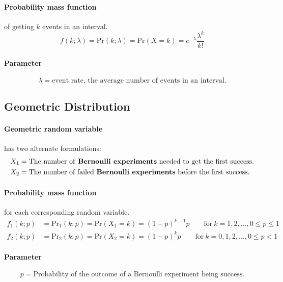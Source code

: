 \documentclass[12pt]{article}
\theoremstyle{plain}
\theoremstyle{definition}
\theoremstyle{remark}
\begin{document}
\paragraph{Probability mass function} of getting $k$ events in an interval.
\begin{equation*}
  f(k;\lambda) = \mathrm{Pr}(k;\lambda) = \mathrm{Pr}(X=k) =
  e^{-\lambda}\frac{\lambda^k}{k!}
\end{equation*}

\paragraph{Parameter}
\begin{equation*}
  \lambda = \text{event rate, the average number of events in an interval.}
\end{equation*}

\subsection{Geometric Distribution}

\paragraph{Geometric random variable} has two alternate formulations:
\begin{align*}
  X_1 & = \text{The number of \textbf{Bernoulli experiments} needed to get the
        first success.} \\
  X_2 & = \text{The number of failed \textbf{Bernoulli experiments} before the
        first success.}
\end{align*}

\paragraph{Probability mass function} for each corresponding random variable.
\begin{align*}
  f_1(k;p) & = \mathrm{Pr}_1(k;p) = \mathrm{Pr}(X_1=k) = (1-p)^{k-1}p
           \qquad \text{for}\ k=1,2,\dots, 0 \leq p \leq 1 \\
  f_2(k;p) & = \mathrm{Pr}_2(k;p) = \mathrm{Pr}(X_2=k) = (1-p)^kp
           \qquad \text{for}\ k=0,1,2,\dots, 0 \leq p < 1
\end{align*}

\paragraph{Parameter}
\begin{equation*}
  p = \text{Probability of the outcome of a Bernoulli experiment being success.}
\end{equation*}
\end{document}
